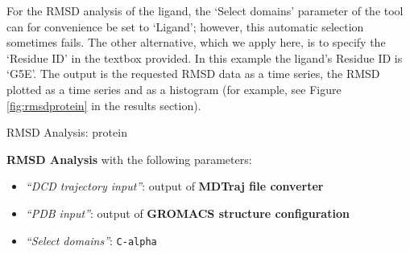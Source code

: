 \documentclass[twocolumn]{bmcart}%
\providecommand{\tightlist}{%
  \setlength{\itemsep}{0pt}\setlength{\parskip}{0pt}}
\begin{document}
For the RMSD analysis of the ligand, the `Select domains' parameter of the tool can for convenience be set to `Ligand'; however, this automatic selection sometimes fails. The other alternative, which we apply here, is to specify the `Residue ID' in the textbox provided. In this example the ligand's Residue ID is `G5E'. The output is the requested RMSD data as a time series, the RMSD plotted as a time series and as a histogram (for example, see Figure \ref{fig:rmsdprotein} in the results section).

\begin{handson_box_colour}{RMSD Analysis: protein}

  \textbf{RMSD Analysis} with the following parameters:

  \begin{itemize}
  \tightlist
    \item
    \emph{``DCD trajectory input''}: output of
    \textbf{MDTraj file converter}
  \item
    \emph{``PDB input''}: output of \textbf{GROMACS
    structure configuration}
  \item
    \emph{``Select domains''}: \texttt{C-alpha}
  \end{itemize}

\end{handson_box_colour}


\end{document}
